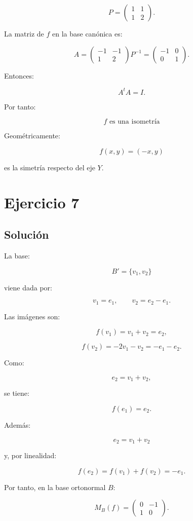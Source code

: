 \documentclass[11pt,a4paper]{article}
\begin{document}
\[
P=
\begin{pmatrix}
1&1\\
1&2
\end{pmatrix}.
\]

La matriz de \(f\) en la base canónica es:

\[
A
=
\begin{pmatrix}
-1&-1\\
1&2
\end{pmatrix}
P^{-1}
=
\begin{pmatrix}
-1&0\\
0&1
\end{pmatrix}.
\]

Entonces:

\[
A^tA
=
I.
\]

Por tanto:

\[
\boxed{
f\text{ es una isometría}
}
\]

Geométricamente:

\[
\boxed{
f(x,y)=(-x,y)
}
\]

es la simetría respecto del eje \(Y\).

\section{Ejercicio 7}
\subsection{Solución}

La base:

\[
B'=\{v_1,v_2\}
\]

viene dada por:

\[
v_1=e_1,
\qquad
v_2=e_2-e_1.
\]

Las imágenes son:

\[
f(v_1)=v_1+v_2=e_2,
\]

\[
f(v_2)=-2v_1-v_2=-e_1-e_2.
\]

Como:

\[
e_2=v_1+v_2,
\]

se tiene:

\[
f(e_1)=e_2.
\]

Además:

\[
e_2=v_1+v_2
\]

y, por linealidad:

\[
f(e_2)
=
f(v_1)+f(v_2)
=
-e_1.
\]

Por tanto, en la base ortonormal \(B\):

\[
M_B(f)
=
\begin{pmatrix}
0&-1\\
1&0
\end{pmatrix}.
\]
\end{document}
